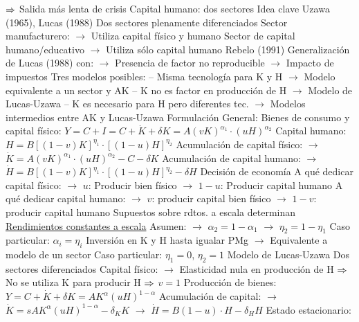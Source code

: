 \documentclass{nuevotema}
\begin{document}
\begin{esquemal}
				\4[] $\then$ Salida más lenta de crisis
				\4[] 
		\2 Capital humano: dos sectores
			\3 Idea clave
				\4 Uzawa (1965), Lucas (1988)
				\4[] Dos sectores plenamente diferenciados
				\4[] Sector manufacturero:
				\4[] $\to$ Utiliza capital físico y humano
				\4[] Sector de capital humano/educativo
				\4[] $\to$ Utiliza sólo capital humano
				\4 Rebelo (1991)
				\4[] Generalización de Lucas (1988) con:
				\4[] $\to$ Presencia de factor no reproducible
				\4[] $\to$ Impacto de impuestos
				\4[] Tres modelos posibles:
				\4[] -- Misma tecnología para K y H
				\4[] \quad $\to$ Modelo equivalente a un sector y AK
				\4[] -- K no es factor en producción de H
				\4[] \quad $\to$ Modelo de Lucas-Uzawa
				\4[] -- K es necesario para H pero diferentes tec.
				\4[] \quad $\to$ Modelos intermedios entre AK y Lucas-Uzawa
			\3 Formulación
				\4 General:
				\4[] Bienes de consumo y capital físico:
				\4[] $Y=C+I = C + \dot{K} + \delta K = A (vK)^{\alpha_1} \cdot (uH)^{\alpha_2}$
				\4[] Capital humano:
				\4[] $H = B\left[ (1-v)K \right]^{\eta_1} \cdot \left[(1-u)H \right]^{\eta_2}$
				\4[] Acumulación de capital físico:
				\4[] $\to$ $\dot{K} = A (vK)^{\alpha_1} \cdot (uH)^{\alpha_2} -C - \delta K$
				\4[] Acumulación de capital humano:
				\4[] $\to$ $\dot{H} = B \left[ (1-v) K \right]^{\eta_1} \cdot \left[ (1-u) H \right]^{\eta_2} -  \delta H$
				\4 Decisión de economía
				\4[] A qué dedicar capital físico:
				\4[] $\to$ $u$: Producir bien físico
				\4[] $\to$ $1-u$: Producir capital humano
				\4[] A qué dedicar capital humano:
				\4[] $\to$ $v$: producir capital bien físico
				\4[] $\to$ $1-v$: producir capital humano
				\4[$\then$] Supuestos sobre rdtos. a escala determinan
				\4 \underline{Rendimientos constantes a escala}
				\4[] Asumen:
				\4[] $\to$ $\alpha_2 = 1 - \alpha_1$
				\4[] $\to$ $\eta_2 = 1 - \eta_1$
				\4 Caso particular: $\alpha_i = \eta_i$
				\4[] Inversión en K y H hasta igualar PMg
				\4[] $\to$ Equivalente a modelo de un sector
				\4 Caso particular: $\eta_1 = 0$, $\eta_2 = 1$
				\4[] Modelo de Lucas-Uzawa
				\4[] Dos sectores diferenciados
				\4[] Capital físico:
				\4[] $\to$ Elasticidad nula en producción de H
				\4[] $\then$ No se utiliza K para producir H
				\4[] $\then$ $v=1$
				\4[] Producción de bienes:
				\4[] $Y = C + \dot{K} + \delta K = AK^\alpha (uH)^{1-\alpha}$
				\4[] Acumulación de capital:
				\4[] $\to$ $\dot{K}  = s AK^\alpha (uH)^{1-\alpha} - \delta_K K$
				\4[] $\to$ $\dot{H} = B \left( 1-u \right) \cdot H - \delta_H H$
				\4[] Estado estacionario:

\end{esquemal}
\end{document}
